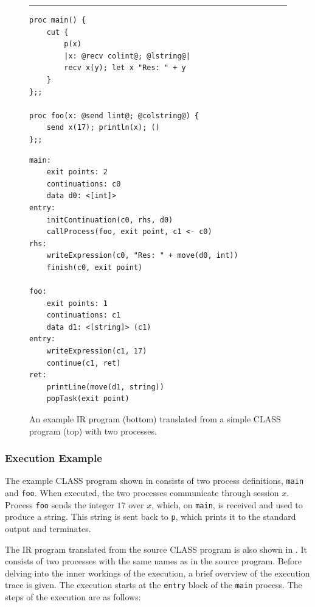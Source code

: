 \documentclass[sigconf,nonacm,natbib=true]{acmart}
\begin{document}
\begin{figure}
    \hrule
    \begin{lstlisting}[language=CLASS]
proc main() {
    cut {
        p(x)
        |x: @recv colint@; @lstring@|
        recv x(y); let x "Res: " + y
    }
};;

proc foo(x: @send lint@; @colstring@) {
    send x(17); println(x); ()
};;
    \end{lstlisting}
    \begin{lstlisting}[language=IR,firstnumber=1]
main:
    exit points: 2
    continuations: c0
    data d0: <[int]>
entry:
    initContinuation(c0, rhs, d0)
    callProcess(foo, exit point, c1 <- c0)
rhs:
    writeExpression(c0, "Res: " + move(d0, int))
    finish(c0, exit point)
   
foo:
    exit points: 1
    continuations: c1
    data d1: <[string]> (c1)
entry:
    writeExpression(c1, 17)
    continue(c1, ret)
ret:
    printLine(move(d1, string))
    popTask(exit point)
    \end{lstlisting}
    \caption{An example IR program (bottom) translated from a simple \ac{CLASS} program (top) with two processes.}
    \label{fig:IRProcessExample}
\end{figure}

\subsubsection{Execution Example}

The example \ac{CLASS} program shown in  consists of two process definitions, \texttt{main} and \texttt{foo}. When executed, the two processes communicate through session $x$. Process \texttt{foo} sends the integer $17$ over $x$, which, on \texttt{main}, is received and used to produce a string. This string is sent back to \texttt{p}, which prints it to the standard output and terminates.

The \ac{IR} program translated from the source \ac{CLASS} program is also shown in . It consists of two processes with the same names as in the source program. Before delving into the inner workings of the execution, a brief overview of the execution trace is given. The execution starts at the \texttt{entry} block of the \texttt{main} process. The steps of the execution are as follows:
\end{document}
